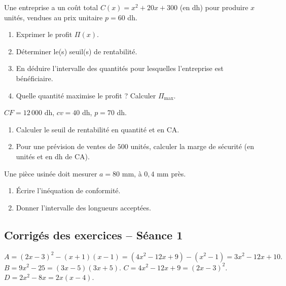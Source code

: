 \documentclass[12pt,a4paper]{article}
\begin{document}
\begin{exobox}
Une entreprise a un coût total $C(x) = x^2+20x+300$ (en dh) pour produire $x$ unités, vendues au prix unitaire $p=60$ dh.
\begin{enumerate}[label=\alph*)]
  \item Exprimer le profit $\Pi(x)$.
  \item Déterminer le(s) seuil(s) de rentabilité.
  \item En déduire l'intervalle des quantités pour lesquelles l'entreprise est bénéficiaire.
  \item Quelle quantité maximise le profit ? Calculer $\Pi_{\max}$.
\end{enumerate}
\end{exobox}

\begin{exobox}
$CF=12\,000$ dh, $cv=40$ dh, $p=70$ dh.
\begin{enumerate}[label=\alph*)]
  \item Calculer le seuil de rentabilité en quantité et en CA.
  \item Pour une prévision de ventes de $500$ unités, calculer la marge de sécurité (en unités et en dh de CA).
\end{enumerate}
\end{exobox}

\begin{exobox}
Une pièce usinée doit mesurer $a=80$ mm, à $0{,}4$ mm près.
\begin{enumerate}[label=\alph*)]
  \item Écrire l'inéquation de conformité.
  \item Donner l'intervalle des longueurs acceptées.
\end{enumerate}
\end{exobox}

\subsection{Corrigés des exercices -- Séance 1}

\begin{corrigebox}
$A = (2x-3)^2-(x+1)(x-1) = (4x^2-12x+9)-(x^2-1) = 3x^2-12x+10.$\\
$B = 9x^2-25 = (3x-5)(3x+5).$ \qquad $C = 4x^2-12x+9 = (2x-3)^2.$\\
$D=2x^2-8x=2x(x-4).$
\end{corrigebox}
\end{document}
